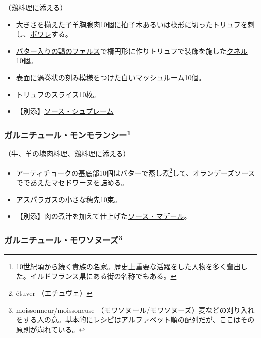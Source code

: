 \begin{recette}
（鶏料理に添える）

\begin{itemize}
\item
  大きさを揃えた子羊胸腺肉10個に拍子木あるいは楔形に切ったトリュフを刺し、\protect\hyperlink{les-poeles}{ポワレ}する。
\item
  \protect\hyperlink{farce-b}{バター入りの鶏のファルス}で楕円形に作りトリュフで装飾を施した\protect\hyperlink{quenelles-diverses}{クネル}
  10個。
\item
  表面に渦巻状の刻み模様をつけた白いマッシュルーム10個。
\item
  トリュフのスライス10枚。
\item
  【別添】\protect\hyperlink{sauce-supreme}{ソース・シュプレーム}
\end{itemize}

\atoaki{}

\hypertarget{garniture-a-la-montmorency}{%
\subsubsection[ガルニチュール・モンモランシー]{\texorpdfstring{ガルニチュール・モンモランシー\footnote{10世紀頃から続く貴族の名家。歴史上重要な活躍をした人物を多く輩出した。イルドフランス県にある街の名称でもある。}}{ガルニチュール・モンモランシー}}\label{garniture-a-la-montmorency}}



（牛、羊の塊肉料理、鶏料理に添える）

\begin{itemize}
\item
  アーティチョークの基底部10個はバターで蒸し煮\footnote{étuver
    （エチュヴェ）}して、オランデーズソースでであえた\protect\hyperlink{garniture-macedoine}{マセドワーヌ}を詰める。
\item
  アスパラガスの小さな穂先10束。
\item
  【別添】肉の煮汁を加えて仕上げた\protect\hyperlink{sauce-madere}{ソース・マデール}。
\end{itemize}

\atoaki{}

\hypertarget{garniture-a-la-moissonneuse}{%
\subsubsection[ガルニチュール・モワソヌーズ]{\texorpdfstring{ガルニチュール・モワソヌーズ\footnote{moissonneur/moissoneuse
  （モワソヌール/モワソヌーズ）麦などの刈り入れをする人の意。基本的にレシピはアルファベット順の配列だが、ここはその原則が崩れている。}}{ガルニチュール・モワソヌーズ}}\label{garniture-a-la-moissonneuse}}


\end{recette}

